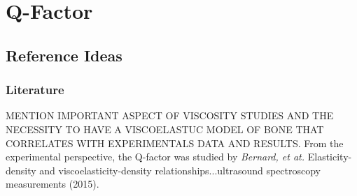 \chapter{Q-Factor}
\section{Reference Ideas}

\subsection{Literature}
MENTION IMPORTANT ASPECT OF VISCOSITY STUDIES AND THE NECESSITY TO HAVE A VISCOELASTUC MODEL OF BONE THAT CORRELATES WITH EXPERIMENTALS DATA AND RESULTS.
From the experimental perspective, the Q-factor was studied by \textit{Bernard, et at.} Elasticity-density and viscoelasticity-density relationships...ultrasound spectroscopy measurements (2015).
